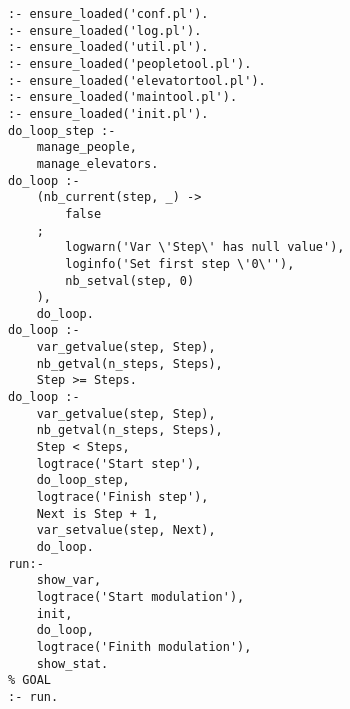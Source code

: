 
\begin{lstlisting}[basicstyle=\scriptsize]
:- ensure_loaded('conf.pl').
:- ensure_loaded('log.pl').
:- ensure_loaded('util.pl').
:- ensure_loaded('peopletool.pl').
:- ensure_loaded('elevatortool.pl').
:- ensure_loaded('maintool.pl').
:- ensure_loaded('init.pl').
do_loop_step :-
	manage_people,
	manage_elevators.
do_loop :-
	(nb_current(step, _) ->
		false
	;
		logwarn('Var \'Step\' has null value'),
		loginfo('Set first step \'0\''),
		nb_setval(step, 0)
	),
	do_loop.
do_loop :-
	var_getvalue(step, Step),
	nb_getval(n_steps, Steps),
	Step >= Steps.
do_loop :-
	var_getvalue(step, Step),
	nb_getval(n_steps, Steps),
	Step < Steps,
	logtrace('Start step'),
	do_loop_step,
	logtrace('Finish step'),
	Next is Step + 1,
	var_setvalue(step, Next),
	do_loop.
run:-
	show_var,
	logtrace('Start modulation'),
	init,
	do_loop,
	logtrace('Finith modulation'),
	show_stat.
% GOAL
:- run.
\end{lstlisting}

